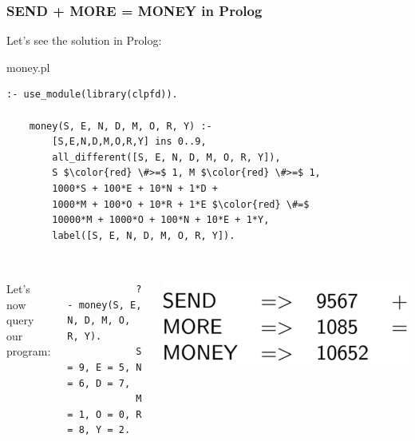 \documentclass{beamer}
\begin{document}
\begin{frame}[fragile]
\frametitle{SEND + MORE = MONEY in Prolog}

Let's see the solution in Prolog:

\begin{exampleblock}{money.pl}
    \begin{lstlisting}[mathescape]
	:- use_module(library(clpfd)).

	money(S, E, N, D, M, O, R, Y) :-
		[S,E,N,D,M,O,R,Y] ins 0..9,
		all_different([S, E, N, D, M, O, R, Y]),
		S $\color{red} \#>=$ 1, M $\color{red} \#>=$ 1,
		1000*S + 100*E + 10*N + 1*D +
		1000*M + 100*O + 10*R + 1*E $\color{red} \#=$
		10000*M + 1000*O + 100*N + 10*E + 1*Y,
		label([S, E, N, D, M, O, R, Y]).
		
\end{lstlisting}
\end{exampleblock}
	\begin{columns}
Let's now query our program:
        	\begin{lstlisting}
			?- money(S, E, N, D, M, O, R, Y).
			S = 9, E = 5, N = 6, D = 7,
			M = 1, O = 0, R = 8, Y = 2.
			\end{lstlisting}
			\includegraphics[scale=0.04]{img/money_result.png}
	\end{columns}

\end{frame}
\end{document}
